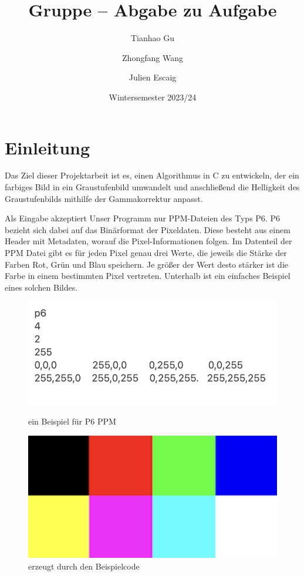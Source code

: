 \documentclass[course=erap]{aspdoc}
\author{Tianhao Gu \and Zhongfang Wang \and Julien Escaig}
\date{Wintersemester 2023/24} %
\title{Gruppe \theGroup{} -- Abgabe zu Aufgabe \theNumber}
\begin{document}
\maketitle

\section{Einleitung}

\par
Das Ziel dieser Projektarbeit ist es, einen Algorithmus in C zu entwickeln, der ein farbiges Bild in ein Graustufenbild umwandelt und anschließend die Helligkeit des Graustufenbilds mithilfe der Gammakorrektur anpasst.

\par
Als Eingabe akzeptiert Unser Programm nur PPM-Dateien des Typs P6. P6 bezieht sich dabei auf das Binärformat der Pixeldaten.  Diese besteht aus einem Header mit Metadaten, worauf die Pixel-Informationen folgen. Im Datenteil der PPM Datei gibt es für jeden Pixel genau drei Werte, die jeweils die Stärke der Farben Rot, Grün und Blau speichern. Je größer der Wert desto stärker ist die Farbe in einem bestimmten Pixel vertreten. Unterhalb ist ein einfaches Beispiel eines solchen Bildes.

\begin{figure}[h]
\begin{minipage}{0.45\textwidth}
\centering
\includegraphics[width=\textwidth]{Bilder/demograph.png}
\caption{ein Beispiel für P6 PPM}
\end{minipage}
\hfill
\begin{minipage}{0.45\textwidth}
\centering
\includegraphics[width=\textwidth]{Bilder/demograph.ppm.png}
\caption{erzeugt durch den Beispielcode}
\end{minipage}
\end{figure}
\end{document}

